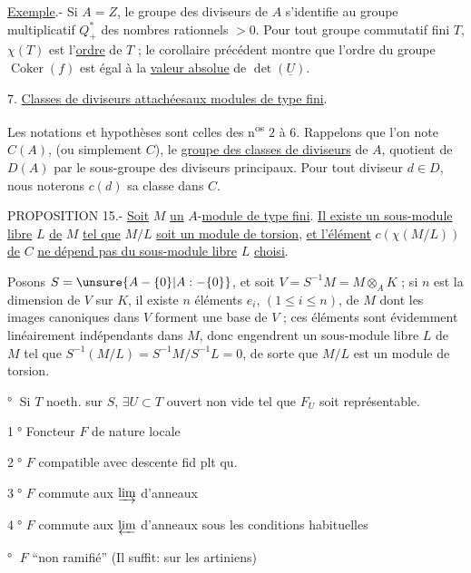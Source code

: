 \uline{Exemple}.- Si $A=Z$, le groupe des diviseurs de $A$ s'identifie au groupe multiplicatif $Q_+^*$ des nombres rationnels $>0$. Pour tout groupe commutatif fini $T$, $\chi(T)$ est l'\uline{ordre} de $T$ ; le corollaire précédent montre que l'ordre du groupe $\operatorname{Coker}(f)$ est égal à la \uline{valeur absolue} de $\det(\underline{U})$.

7. \uline{Classes de diviseurs attachéesaux modules de type fini}.

Les notations et hypothèses sont celles des n\textsuperscript{os} $2$ à $6$. Rappelons que l'on note $C(A)$, (ou simplement $C$), le \uline{groupe des classes de diviseurs} de $A$, quotient de $D(A)$ par le sous-groupe des diviseurs principaux. Pour tout diviseur $d\in D$, nous noterons $c(d)$ sa classe dans $C$.

PROPOSITION 15.- \uline{Soit} $M$ \uline{un} $A$-\uline{module de type fini}. \uline{Il existe un sous-module libre} $L$ \uline{de} $M$ \uline{tel que} $M/L$ \uline{soit un module de torsion}, \uline{et l'élément} $c(\chi(M/L))$ \uline{de} $C$ \uline{ne dépend pas du sous-module libre} $L$ \uline{choisi}.

Posons $S=\unsure{A-\{0\}|A:-\{0\}}$, et soit $V=S^{-1}M=M\otimes_A K$ ; si $n$ est la dimension de $V$ sur $K$, il existe $n$ éléments $e_i$, $(1\le i\le n)$, de $M$ dont les images canoniques dans $V$ forment une base de $V$ ; ces éléments sont évidemment linéairement indépendants dans $M$, donc engendrent un sous-module libre $L$ de $M$ tel que $S^{-1}(M/L)=S^{-1}M/S^{-1}L=0$, de sorte que $M/L$ est un module de torsion.

\textcircled{°} Si $T$ noeth.  sur $S$, $\exists U\subset T$ ouvert non vide tel que $F_U$ soit représentable.

\textcircled{1°} Foncteur $F$ de nature locale

\textcircled{2°} $F$ compatible avec descente fid plt qu. 

\textcircled{3°} $F$ commute aux $\varinjlim$ d'anneaux

\textcircled{4°} $F$ commute aux $\varprojlim$ d'anneaux  sous les conditions habituelles

\textcircled{°} $F$ ``non ramifié''  (Il suffit: sur les artiniens)

